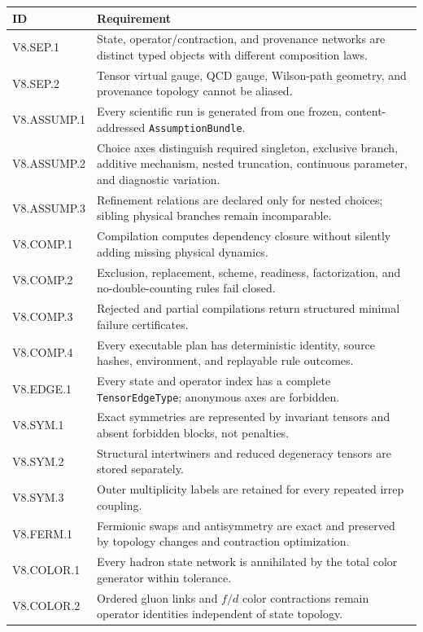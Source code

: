\documentclass[11pt]{article}
\newcommand{\AssumptionBundle}{\texttt{AssumptionBundle}}
\newcommand{\TensorEdgeType}{\texttt{TensorEdgeType}}
\begin{document}
\begin{longtable}{L{0.15\textwidth}L{0.77\textwidth}}
\toprule
ID & Requirement\\
\midrule
\endhead
V8.SEP.1 & State, operator/contraction, and provenance networks are distinct typed objects with different composition laws.\\
V8.SEP.2 & Tensor virtual gauge, QCD gauge, Wilson-path geometry, and provenance topology cannot be aliased.\\
V8.ASSUMP.1 & Every scientific run is generated from one frozen, content-addressed \AssumptionBundle.\\
V8.ASSUMP.2 & Choice axes distinguish required singleton, exclusive branch, additive mechanism, nested truncation, continuous parameter, and diagnostic variation.\\
V8.ASSUMP.3 & Refinement relations are declared only for nested choices; sibling physical branches remain incomparable.\\
V8.COMP.1 & Compilation computes dependency closure without silently adding missing physical dynamics.\\
V8.COMP.2 & Exclusion, replacement, scheme, readiness, factorization, and no-double-counting rules fail closed.\\
V8.COMP.3 & Rejected and partial compilations return structured minimal failure certificates.\\
V8.COMP.4 & Every executable plan has deterministic identity, source hashes, environment, and replayable rule outcomes.\\
V8.EDGE.1 & Every state and operator index has a complete \TensorEdgeType; anonymous axes are forbidden.\\
V8.SYM.1 & Exact symmetries are represented by invariant tensors and absent forbidden blocks, not penalties.\\
V8.SYM.2 & Structural intertwiners and reduced degeneracy tensors are stored separately.\\
V8.SYM.3 & Outer multiplicity labels are retained for every repeated irrep coupling.\\
V8.FERM.1 & Fermionic swaps and antisymmetry are exact and preserved by topology changes and contraction optimization.\\
V8.COLOR.1 & Every hadron state network is annihilated by the total color generator within tolerance.\\
V8.COLOR.2 & Ordered gluon links and \(f/d\) color contractions remain operator identities independent of state topology.\\

\end{longtable}
\end{document}

